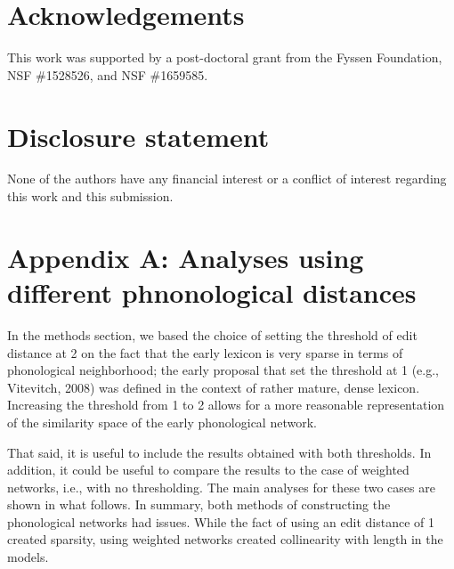 \documentclass[english,,man,floatsintext]{apa6}
\begin{document}
\vspace{1em}

 \vspace{1em}

\hypertarget{acknowledgements}{%
\section{Acknowledgements}\label{acknowledgements}}

This work was supported by a post-doctoral grant from the Fyssen Foundation, NSF \#1528526, and NSF \#1659585.

\hypertarget{disclosure-statement}{%
\section{Disclosure statement}\label{disclosure-statement}}

None of the authors have any financial interest or a conflict of interest regarding this work and this submission.

\clearpage

\hypertarget{appendix-a-analyses-using-different-phnonological-distances}{%
\section{Appendix A: Analyses using different phnonological distances}\label{appendix-a-analyses-using-different-phnonological-distances}}

In the methods section, we based the choice of setting the threshold of edit distance at 2 on the fact that the early lexicon is very sparse in terms of phonological neighborhood; the early proposal that set the threshold at 1 (e.g., Vitevitch, 2008) was defined in the context of rather mature, dense lexicon. Increasing the threshold from 1 to 2 allows for a more reasonable representation of the similarity space of the early phonological network.

That said, it is useful to include the results obtained with both thresholds. In addition, it could be useful to compare the results to the case of weighted networks, i.e., with no thresholding. The main analyses for these two cases are shown in what follows. In summary, both methods of constructing the phonological networks had issues. While the fact of using an edit distance of 1 created sparsity, using weighted networks created collinearity with length in the models.
\end{document}
